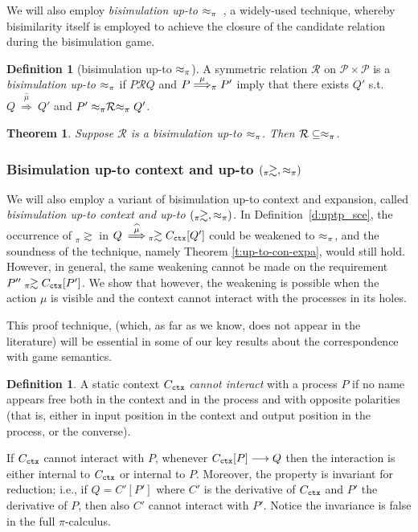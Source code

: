 \documentclass[11pt,a4paper]{amsart}
\theoremstyle{plain}
\theoremstyle{definition}
\theoremstyle{defC}
\theoremstyle{thmC}
\theoremstyle{plain}
\numberwithin{equation}{section}
\newcommand{\pr}{{\mathcal P}}
\newcommand{\ct}[1]{ C_{\rmm{ctx}} \brac{#1} }   %
\newcommand{\qct}{ C_{\rmm{ctx}}  }              %
\newcommand{\ctp}[1]{ C' \brac{#1} }   %
\newcommand{\qctp}{ C'  }              %
\newcommand{\brac}[1]{[#1] }   %
\newcommand{\rmm}[1]{{\tt{\lowercase{#1}}}}
\newcommand{\genArr}[2]{\mathrel{\stackrel{{#1}}{\Longrightarrow}_{\rmm{\lowercase{#2}}}}}  %
\newcommand{\ArrPI}[1]{\genArr{#1}{\pi}}   %
\newcommand{\Arcap}[1]{\:\stackrel{{\widehat{#1}}}{\Longrightarrow}\:}
\newcommand{\genwb}[1]{\mathrel{\approx_{\rmm{\lowercase{#1}}}}}       %
\newcommand{\wbPI}{\genwb{\pi}}       %
\newcommand{\contr}{\mathrel{\mbox{}_{\pi}\!\!\gtrsim}}
\def\R{{\mathcal R}}
\def\RR{\mathrel{\mathcal R}}
\theoremstyle{plain}
\newtheorem{theorem}[thm]{Theorem}
\theoremstyle{definition}
\newtheorem{definition}[thm]{Definition}
\begin{document}
We will also employ {\em bisimulation up-to $\wbPI$}~\cite{Mil89}, 
a widely-used technique,
whereby bisimilarity itself is employed to achieve 
the closure of the candidate relation during the bisimulation game.


\begin{definition}
  [bisimulation up-to $\wbPI$]
  A symmetric relation $\R$ on $\pr  \times \pr$
  is a {\em bisimulation up-to $\wbPI$ } if $P  \RR  Q$ and $P
  \ArrPI\mu P'$ imply that  there exists $Q'$ s.t.
  $Q \Arcap\mu Q'$ and 
  $P' \wbPI  \RR \wbPI Q'$. 
\end{definition}
 

\begin{theorem}
\label{t:up-to}
  Suppose $\R$ is a {\em bisimulation up-to $\wbPI$}.
  Then $\R \subseteq \wbPI$.
\end{theorem}


\subsubsection{Bisimulation up-to context and up-to $(\contr,
\wbPI)$}

We will also employ
a variant of bisimulation up-to context and expansion, called 
{\em bisimulation up-to context and up-to $(\contr,\wbPI)$}.
In Definition~\ref{d:uptp_sce}, the occurrence of $\contr$  in 
$Q \Arcap\mu  \contr  \ct{Q'}$  could be weakened to $\wbPI$, and the
soundness of the technique, namely Theorem \ref{t:up-to-con-expa},
would still hold. However, in general, the same weakening
cannot be made on the requirement $P'' \contr \ct {P'}$.
We show that however, the weakening is possible when 
the action $\mu$ is visible and the context cannot interact with the
processes in its holes.

This proof technique, 
(which, as far as we know, does not appear in the literature) 
will be essential in some of our key results 
about the correspondence with game semantics.

\begin{definition}
  \label{d:interact}
  A static context $\qct$  \emph{cannot interact} with a process $P$
  if no name appears free both in the context and in
  the process and with opposite polarities (that is, either in input
  position in the context and output position in the process, or the
  converse).  
\end{definition} 

If  $\qct$ {cannot interact} with $P$,
whenever $\ct P \longrightarrow Q$ then  the
interaction is either internal to $\qct$ or internal to $P$. Moreover,
the property is invariant for reduction; i.e., 
if $Q = \ctp{P'}$ where $\qctp$ is the derivative of $\qct$ and $P'$
the derivative of $P$, then also 
$\qctp$  cannot interact with  $P'$.
Notice the invariance is false in the full $\pi$-calculus. 
\end{document}
